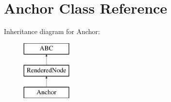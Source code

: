 \hypertarget{classanchor_1_1_anchor}{}\section{Anchor Class Reference}
\label{classanchor_1_1_anchor}
Inheritance diagram for Anchor\+:\begin{figure}[H]
\begin{center}
\leavevmode
\includegraphics[height=3.000000cm]{classanchor_1_1_anchor}
\end{center}
\end{figure}
